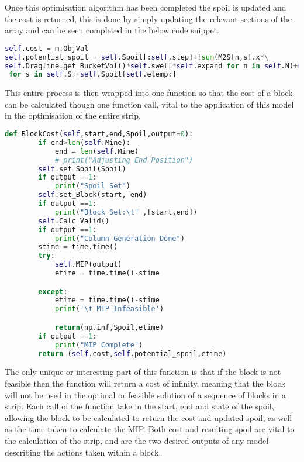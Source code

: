 Once this optimisation algorithm has been completed the spoil is updated and the cost is returned, this is done by simply updating the relevant sections of the array and can be seen completed in the below code snippet.
\begin{lstlisting}[language=python]
self.cost = m.ObjVal
self.potential_spoil = self.Spoil[:self.step]+[sum(M2S[n,s].x*\
self.Dragline.get_BucketVol()*self.swell*self.expand for n in self.N)+self.Spoil[s]\
 for s in self.S]+self.Spoil[self.etemp:]

\end{lstlisting}
This entire process is then wrapped into one function so that the cost of a block can be calculated though one function call, vital to the application of this model in the optimisation of the entire strip. 
\begin{lstlisting}[language=python]
	def BlockCost(self,start,end,Spoil,output=0):
		if end>len(self.Mine):
			end = len(self.Mine)
			# print("Adjusting End Position")
		self.set_Spoil(Spoil)
		if output ==1:
			print("Spoil Set")
		self.set_Block(start, end)
		if output ==1:
			print("Block Set:\t" ,[start,end])
		self.Calc_Valid()
		if output ==1:
			print("Column Generation Done")
		stime = time.time()
		try:
			self.MIP(output)
			etime = time.time()-stime

		except:
			etime = time.time()-stime
			print('\t MIP Infeasible')

			return(np.inf,Spoil,etime)
		if output ==1:
			print("MIP Complete")
		return (self.cost,self.potential_spoil,etime)
		\end{lstlisting}
The only unique or interesting part of this function is that if the block is not feasible then the function will return a cost of infinity, meaning that the block will not be used in the optimal or feasible solution of a sequence of blocks in a strip. Each call of the function take in the start, end and state of the spoil, allowing the block to be calculated to return the cost and updated spoil, as well as the time taken to calculate the MIP. Both cost and resulting spoil are vital to the calculation of the strip, and are the two desired outputs of any model describing the actions taken within a block. 
